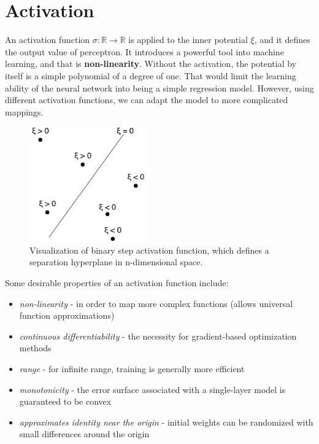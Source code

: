 \section{Activation}

An activation function $\sigma: \mathbb{R} \rightarrow \mathbb{R}$ is applied to the inner potential $\xi$, and it defines the output value of perceptron. It introduces a powerful tool into machine learning, and that is \textbf{non-linearity}. Without the activation, the potential by itself is a simple polynomial of a degree of one. That would limit the learning ability of the neural network into being a simple regression model. However, using different activation functions, we can adapt the model to more complicated mappings.

\begin{figure}[h]

\centering
\includegraphics[width=0.45\textwidth]{tex/images/activation-vis}
\caption{Visualization of binary step activation function, which defines a separation hyperplane in n-dimensional space.}
\end{figure}

\noindent
Some desirable properties\cite{wiki:activation} of an activation function include:

\begin{itemize}

\item \textit{non-linearity} - in order to map more complex functions (allows universal function approximations)
\item \textit{continuous differentiability} - the necessity for gradient-based optimization methods
\item \textit{range} - for infinite range, training is generally more efficient
\item \textit{monotonicity} - the error surface associated with a single-layer model is guaranteed to be convex
\item \textit{approximates identity near the origin} - initial weights can be randomized with small differences around the origin

\end{itemize}

